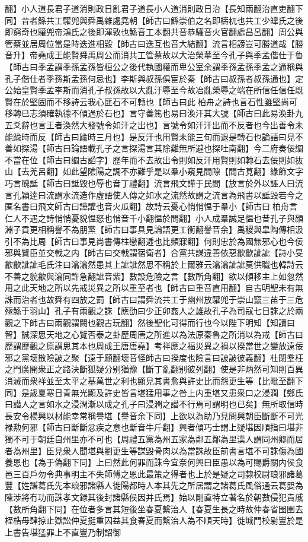 翻】小人道長君子道消則政日亂君子道長小人道消則政日治【長知兩翻治直吏翻下同】昔者鯀共工驩兜與舜禹雜處堯朝【師古曰鯀崇伯之名即檮杌也共工少皥氏之後即窮奇也驩兜帝鴻氏之後即渾敦也鯀音工本翻共音恭驩音火官翻處昌呂翻】周公與管蔡並居周位當是時迭進相毀【師古曰迭互也音大結翻】流言相謗豈可勝道哉【勝音升】帝堯成王能賢舜禹周公而消共工管蔡故以大治榮華至今孔子與季孟偕仕于魯【師古曰季孟謂季孫孟孫皆桓公之後代執國權而卑公室余謂季孫孟孫季孟之通稱與孔子偕仕者季孫斯孟孫何忌也】李斯與叔孫俱宦於秦【師古曰叔孫者叔孫通也】定公始皇賢季孟李斯而消孔子叔孫故以大亂汙辱至今故冶亂榮辱之端在所信任信任既賢在於堅固而不移詩云我心匪石不可轉也【師古曰此柏舟之詩也言石性雖堅尚可移轉已志須確執德不傾過於石也】言守善篤也易曰渙汗其大號【師古曰此易渙卦九五爻辭也言王者渙然大發號令如汗之出也】言號令如汗汗出而不反者也今出善令未能踰時而反【師古曰踰時三月也】是反汗也用賢未能三旬而退是轉石也論語曰見不善如探湯【師古曰論語載孔子之言探湯言其除難無所避也探吐南翻】今二府奏佞讇不當在位【師古曰讇古謟字】歷年而不去故出令則如反汗用賢則如轉石去佞則如抜山【去羌呂翻】如此望隂陽之調不亦難乎是以羣小窺見間隙【間古莧翻】緣飾文字巧言醜詆【師古曰詆毀也辱也音丁禮翻】流言飛文譁于民間【放言於外以誣人曰流言孔穎逹曰流謂水流造作虛語使人傳之如水之流然故謂之流言為飛書以詆毀若今之匿名書曰飛文師古曰譁讙也音火瓜翻】故詩云憂心悄悄愠于羣小【師古曰柏舟言仁人不遇之詩悄悄憂貌愠怒也悄音千小翻愠於問翻】小人成羣誠足愠也昔孔子與顔淵子貢更相稱譽不為朋黨【師古曰事具見論語更工衡翻譽音余】禹稷與皐陶傳相汲引不為比周【師古曰事見尚書傳柱戀翻逓也比頻寐翻】何則忠於為國無邪心也今佞邪與賢臣並交戟之内【師古曰交戟謂宿衛者】合黨共謀違善依惡歙歙訿訿【詩小旻歙歙訿訿毛氏注曰潝潝然患其上訿訿然思不稱於上爾雅云潝潝訿訿莫供職也韓詩云不善之貌歙與潝同許急翻訿音紫】數設危險之言【數所角翻】欲以傾移主上如忽然用之此天地之所以先戒災異之所以重至者也【師古曰重音直用翻】自古明聖未有無誅而治者也故舜有四放之罰【師古曰謂舜流共工于幽州放驩兜于崇山竄三苖于三危殛鯀于羽山】孔子有兩觀之誅【應劭曰少正卯姦人之雄故孔子為司寇七日誅之於兩觀之下師古曰兩觀謂闕也觀古玩翻】然後聖化可得而行也今以陛下明知【知讀曰智】誠深思天地之心覽否泰之卦歷周唐之所進以為法原秦魯之所消以為戒【師古曰歷謂歷觀之原謂思其本也周成王唐唐堯】考祥應之福災異之禍以揆當世之變放遠佞邪之黨壞散險詖之聚【遠于願翻壞音怪師古曰揆度也險言曰詖詖彼義翻】杜閉羣枉之門廣開衆正之路決斷狐疑分别猶豫【斷丁亂翻别彼列翻】使是非炳然可知則百異消滅而衆祥並至太平之基萬世之利也顯見其書愈與許史比而怨更生等【比毗至翻下同】是歲夏寒日青無光顯及許史皆言堪猛用事之咎上内重堪又患衆口之浸潤【鄭氏曰譛人之言如水之浸潤漸以成之孔子曰浸潤之譛不行焉可謂明也已矣】無所取信時長安令楊興以材能幸常稱譽堪【譽音余下同】上欲以為助乃見問興朝臣斷斷不可光禄勲何邪【師古曰斷斷忿疾之意也斷音牛斤翻】興者傾巧士謂上疑堪因順指曰堪非獨不可于朝廷自州里亦不可也【周禮五黨為州五家為鄰五鄰為里漢人謂同州郷而居者為州里】臣見衆人聞堪與劉更生等謀毀骨肉以為當誅故臣前書言堪不可誅傷為國養恩也【為于偽翻下同】上曰然此何罪而誅今宜奈何興曰臣愚以為可賜爵關内侯食邑三百戶勿令典事明主不失師傅之恩此最策之得者也上於是疑之司隸校尉琅邪諸葛豐【姓譜葛氏先本琅邪諸縣人徙陽都時人本其先之所居謂之諸葛氏風俗通云葛嬰為陳涉將冇功而誅孝文録其後封諸縣侯因并氏焉】始以剛直特立著名於朝數侵犯貴戚【數所角翻下同】在位者多言其短後坐春夏繫治人【春夏生長之時故仲春省囹圉去桎梏毋肆掠止獄訟仲夏挺重囚益其食春夏而繫治人為不順天時】徙城門校尉豐於是上書告堪猛罪上不直豐乃制詔御
